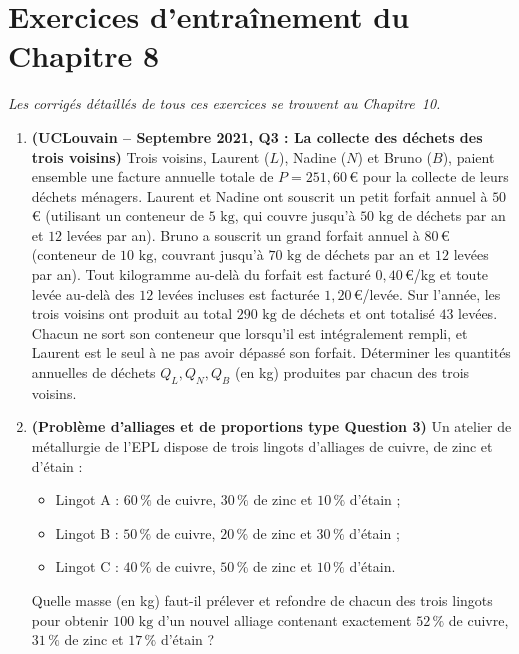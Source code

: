 \section{Exercices d'entraînement du Chapitre 8}

\emph{Les corrigés détaillés de tous ces exercices se trouvent au Chapitre~10.}

\begin{enumerate}[label=\textbf{Exercice 8.\arabic* :}, leftmargin=*]
    \item \textbf{(UCLouvain -- Septembre 2021, Q3 : La collecte des déchets des trois voisins)} Trois voisins, Laurent ($L$), Nadine ($N$) et Bruno ($B$), paient ensemble une facture annuelle totale de $P = 251,60$\,€ pour la collecte de leurs déchets ménagers. Laurent et Nadine ont souscrit un petit forfait annuel à $50$\,€ (utilisant un conteneur de $5\text{ kg}$, qui couvre jusqu'à $50\text{ kg}$ de déchets par an et $12$ levées par an). Bruno a souscrit un grand forfait annuel à $80$\,€ (conteneur de $10\text{ kg}$, couvrant jusqu'à $70\text{ kg}$ de déchets par an et $12$ levées par an). Tout kilogramme au-delà du forfait est facturé $0,40$\,€/kg et toute levée au-delà des $12$ levées incluses est facturée $1,20$\,€/levée.
    Sur l'année, les trois voisins ont produit au total $290\text{ kg}$ de déchets et ont totalisé $43$ levées. Chacun ne sort son conteneur que lorsqu'il est intégralement rempli, et Laurent est le seul à ne pas avoir dépassé son forfait. Déterminer les quantités annuelles de déchets $Q_L, Q_N, Q_B$ (en kg) produites par chacun des trois voisins.
    \item \textbf{(Problème d'alliages et de proportions type Question 3)} Un atelier de métallurgie de l'EPL dispose de trois lingots d'alliages de cuivre, de zinc et d'étain :
    \begin{itemize}
        \item Lingot A : $60\,\%$ de cuivre, $30\,\%$ de zinc et $10\,\%$ d'étain ;
        \item Lingot B : $50\,\%$ de cuivre, $20\,\%$ de zinc et $30\,\%$ d'étain ;
        \item Lingot C : $40\,\%$ de cuivre, $50\,\%$ de zinc et $10\,\%$ d'étain.
    \end{itemize}
    Quelle masse (en kg) faut-il prélever et refondre de chacun des trois lingots pour obtenir $100\text{ kg}$ d'un nouvel alliage contenant exactement $52\,\%$ de cuivre, $31\,\%$ de zinc et $17\,\%$ d'étain ?

\end{enumerate}
